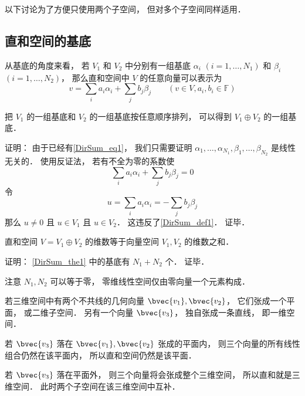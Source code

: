 以下讨论为了方便只使用两个子空间， 但对多个子空间同样适用．

\subsection{直和空间的基底}
从基底的角度来看， 若 $V_1$ 和 $V_2$ 中分别有一组基底 ${\alpha_i}$ $(i = 1, \dots, N_1)$ 和 ${\beta_i}$ $(i = 1, \dots, N_2)$， 那么直和空间中 $V$ 的任意向量可以表示为
\begin{equation}\label{DirSum_eq1}
{v} = \sum_i a_i {\alpha_i} + \sum_j b_j {\beta_j} \qquad (v\in V, a_i, b_i \in \mathbb F)
\end{equation}
\begin{theorem}{}\label{DirSum_the1}
把 $V_1$ 的一组基底和 $V_2$ 的一组基底按任意顺序排列， 可以得到 $V_1 \oplus V_2$ 的一组基底．
\end{theorem}

证明： 由于已经有\autoref{DirSum_eq1}， 我们只需要证明 $\alpha_1, \dots, \alpha_{N_1}, \beta_1, \dots, \beta_{N_2}$ 是线性无关的． 使用反证法， 若有不全为零的系数使
\begin{equation}
\sum_i a_i {\alpha_i} + \sum_j b_j {\beta_j} = 0
\end{equation}
令
\begin{equation}
u = \sum_i a_i {\alpha_i} = -\sum_j b_j {\beta_j}
\end{equation}
那么 $u \ne 0$ 且 $u \in V_1$ 且 $u \in V_2$． 这违反了\autoref{DirSum_def1}． 证毕．

\begin{corollary}{}\label{DirSum_cor1}
直和空间 $V = V_1 \oplus V_2$ 的维数等于向量空间 $V_1, V_2$ 的维数之和．
\end{corollary}
证明： \autoref{DirSum_the1} 中的基底有 $N_1 + N_2$ 个． 证毕．

注意 $N_1, N_2$ 可以等于零， 零维线性空间仅由零向量一个元素构成．

\begin{example}{}\label{DirSum_ex1}
若三维空间中有两个不共线的几何向量 $\bvec{v_1}, \bvec{v_2}$， 它们张成一个平面， 或二维子空间． 另有一个向量 $\bvec{v_3}$， 独自张成一条直线， 即一维空间．

若 $\bvec{v_3}$ 落在 $\bvec{v_1}, \bvec{v_2}$ 张成的平面内， 则三个向量的所有线性组合仍然在该平面内， 所以直和空间仍然是该平面．

若 $\bvec{v_3}$ 落在平面外， 则三个向量将会张成整个三维空间， 所以直和就是三维空间． 此时两个子空间在该三维空间中互补．
\end{example}

